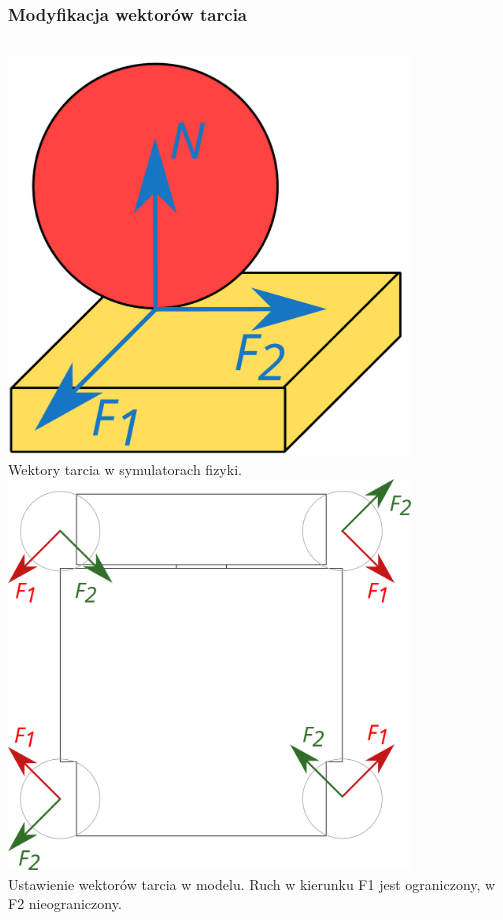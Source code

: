 \documentclass{beamer}
\begin{document}
	\begin{frame}
		\frametitle{Modyfikacja wektorów tarcia}
		\begin{columns}[c]
			\centering
			\includegraphics[width=0.8\textwidth]{graphics/friction.pdf} \\
			Wektory tarcia w symulatorach fizyki.\footnotemark
			\centering
			\includegraphics[width=0.8\textwidth]{graphics/base_vects.pdf} \\
			Ustawienie wektorów tarcia w modelu. Ruch w kierunku F1 jest ograniczony, w F2 nieograniczony.
		\end{columns}
	\end{frame}
	
\end{document}
